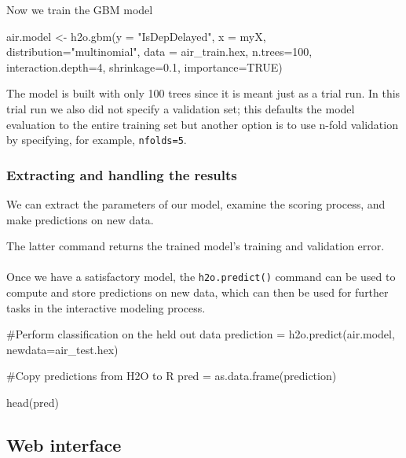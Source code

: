 \documentclass[11pt]{article}
\begin{document}
Now we train the GBM model

\begin{spverbatim}
air.model <- h2o.gbm(y = "IsDepDelayed", x = myX, 
                   distribution="multinomial", 
                   data = air_train.hex, n.trees=100, 
                   interaction.depth=4, 
                   shrinkage=0.1,
                   importance=TRUE)
                   
\end{spverbatim}
\noindent
The model is built with only 100 trees since it is meant just as a trial run. In this trial run we also did not specify a validation set; this defaults the model evaluation to the entire training set but another option is to use n-fold validation by specifying, for example, \texttt{nfolds=5}. 

\subsubsection{Extracting and handling the results} \label{3.2.1}

We can extract the parameters of our model, examine the scoring process, and make predictions on new data.

\noindent
The latter command returns the trained model's training and validation error. 
\\
\\
Once we have a satisfactory model, the \texttt{h2o.predict()} command can be used to compute and store predictions on new data, which can then be used for further tasks in the interactive modeling process.
\begin{spverbatim}
#Perform classification on the held out data
prediction = h2o.predict(air.model, newdata=air_test.hex)

#Copy predictions from H2O to R
pred = as.data.frame(prediction)

head(pred)

\end{spverbatim}


\subsection{Web interface} \label{3.3}
\end{document}
